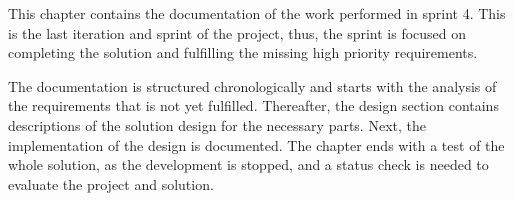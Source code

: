 This chapter contains the documentation of the work performed in sprint 4.
This is the last iteration and sprint of the project, thus, the sprint is focused on completing the solution and fulfilling the missing high priority requirements.

The documentation is structured chronologically and starts with the analysis of the requirements that is not yet fulfilled.
Thereafter, the design section contains descriptions of the solution design for the necessary parts.
Next, the implementation of the design is documented.
The chapter ends with a test of the whole solution, as the development is stopped, and a status check is needed to evaluate the project and solution.
